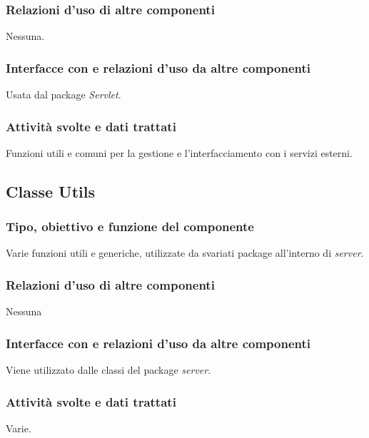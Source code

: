 \subsubsection*{Relazioni d'uso di altre componenti}
Nessuna.
\subsubsection*{Interfacce con e relazioni d'uso da altre componenti}
Usata dal package \emph{Servlet}.
\subsubsection*{Attivit\`a svolte e dati trattati}
Funzioni utili e comuni per la gestione e l'interfacciamento con i servizi
esterni.

\subsection{Classe Utils}
\subsubsection*{Tipo, obiettivo e funzione del componente}
Varie funzioni utili e generiche, utilizzate da svariati package all'interno di
\emph{server}.
\subsubsection*{Relazioni d'uso di altre componenti}
Nessuna
\subsubsection*{Interfacce con e relazioni d'uso da altre componenti}
Viene utilizzato dalle classi del package \emph{server}.
\subsubsection*{Attivit\`a svolte e dati trattati}
Varie.

\newpage
